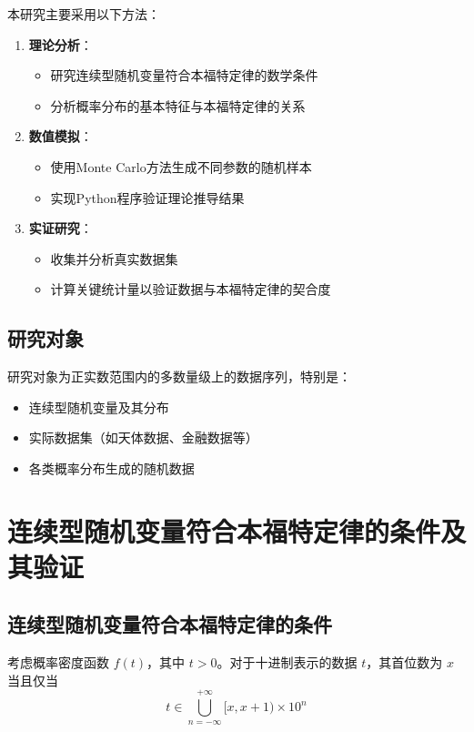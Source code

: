 \documentclass{ctexart} %
\begin{document}
本研究主要采用以下方法：

\begin{enumerate}
    \item \textbf{理论分析}：
    \begin{itemize}
        \item 研究连续型随机变量符合本福特定律的数学条件
        \item 分析概率分布的基本特征与本福特定律的关系
    \end{itemize}

    \item \textbf{数值模拟}：
    \begin{itemize}
        \item 使用Monte Carlo方法生成不同参数的随机样本
        \item 实现Python程序验证理论推导结果
    \end{itemize}

    \item \textbf{实证研究}：
    \begin{itemize}
        \item 收集并分析真实数据集
        \item 计算关键统计量以验证数据与本福特定律的契合度
    \end{itemize}
\end{enumerate}
\subsection{研究对象}

研究对象为正实数范围内的多数量级上的数据序列，特别是：
\begin{itemize}
    \item 连续型随机变量及其分布
    \item 实际数据集（如天体数据、金融数据等）
    \item 各类概率分布生成的随机数据
\end{itemize}

\section{连续型随机变量符合本福特定律的条件及其验证}

\subsection{连续型随机变量符合本福特定律的条件}

考虑概率密度函数 $f(t)$，其中 $t > 0$。对于十进制表示的数据 $t$，其首位数为 $x$ 当且仅当
\[ t \in \bigcup_{n=-\infty}^{+\infty} [x , x+1 )\times 10^n \]
\end{document}
